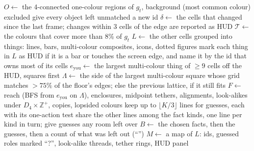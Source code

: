 \begin{algorithm*}[!t]
\caption{\textsc{Perceive}: one frame to the briefing, the map and the object table}
\label{alg:perceive}
$O \gets$ the 4-connected one-colour regions of $g_t$, background (most common colour) excluded\;
give every object left unmatched a new id 
$\delta \gets$ the cells that changed since the last frame; changes within 3 cells of the edge are reported as HUD\;
$\mathcal{T} \gets$ the colours that cover more than 8\% of $g_t$ 
$L \gets$ the other cells grouped into things: lines, bars, multi-colour composites, icons, dotted figures\;
mark each thing in $L$ as HUD if it is a bar or touches the screen edge, and name it by the id that owns most of its cells\;
$e_{\text{you}} \gets$ the largest multi-colour thing of $\geq 9$ cells off the HUD, squares first 
$\Lambda \gets$ the side of the largest multi-colour square whose grid matches $>75\%$ of the floor's edges; else the previous lattice, if it still fits\;
$F \gets$ reach (BFS from $e_{\text{you}}$ on $\Lambda$), enclosures, midpoint tethers, alignments, look-alikes under $D_4{\times}\mathbb{Z}^+$, copies, lopsided colours\;
keep up to $\lfloor K/3 \rfloor$ lines for guesses, each with its one-action test\;
share the other lines among the fact kinds, one line per kind in turn; give guesses any room left over\;
$B \gets$ the chosen facts, then the guesses, then a count of what was left out (``'')\;
$M \gets$ a map of $L$: ids, guessed roles marked ``?'', look-alike threads, tether rings, HUD panel\;
\end{algorithm*}

